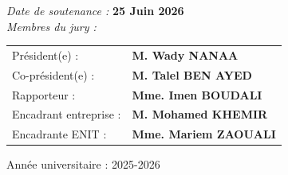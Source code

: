 \begin{titlepage}
\noindent
{\emph{Date de soutenance :}} {\textbf{25 Juin 2026}}\\[0.01cm]

{\emph{Membres du jury :}}\\[0.1cm]

\renewcommand{\arraystretch}{0.86}
\begin{tabular}{@{}ll@{}}
Président(e) : & \textbf{M. Wady NANAA} \\
Co-président(e) : & \textbf{M. Talel BEN AYED } \\
Rapporteur : & \textbf{Mme. Imen BOUDALI} \\
Encadrant entreprise : & \textbf{M. Mohamed KHEMIR} \\
Encadrante ENIT : & \textbf{Mme. Mariem ZAOUALI} \\
\end{tabular}
\begin{center}
Année universitaire : 2025-2026
\end{center}

\vfill

\end{titlepage}